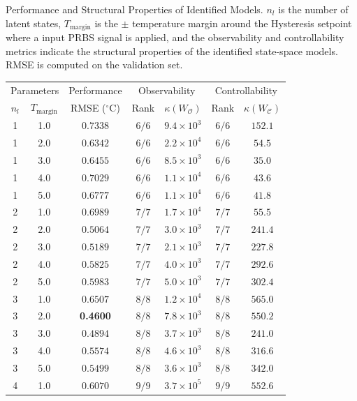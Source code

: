 
\caption{Performance and Structural Properties of Identified Models. $n_l$ is the number of latent states, $T_{\mathrm{margin}}$ is the $\pm$ temperature margin around the Hysteresis setpoint where a input PRBS signal is applied, and the observability and controllability metrics indicate the structural properties of the identified state-space models. RMSE is computed on the validation set.}
\label{tab:model_analysis}
\begin{tabular}{cc c cc cc}
\toprule
\multicolumn{2}{c}{Parameters} & \multicolumn{1}{c}{Performance} & \multicolumn{2}{c}{Observability} & \multicolumn{2}{c}{Controllability} \\
\cmidrule(lr){1-2} \cmidrule(lr){3-3} \cmidrule(lr){4-5} \cmidrule(lr){6-7}
$n_l$ & $T_{\mathrm{margin}}$ & RMSE ($^\circ$C) & Rank & $\kappa(W_{\mathcal{O}})$ & Rank & $\kappa(W_{\mathcal{C}})$ \\
\midrule
1 & 1.0 & $0.7338$ & $6/6$ & $9.4 \times 10^{3}$ & $6/6$ & $152.1$ \\
1 & 2.0 & $0.6342$ & $6/6$ & $2.2 \times 10^{4}$ & $6/6$ & $54.5$ \\
1 & 3.0 & $0.6455$ & $6/6$ & $8.5 \times 10^{3}$ & $6/6$ & $35.0$ \\
1 & 4.0 & $0.7029$ & $6/6$ & $1.1 \times 10^{4}$ & $6/6$ & $43.6$ \\
1 & 5.0 & $0.6777$ & $6/6$ & $1.1 \times 10^{4}$ & $6/6$ & $41.8$ \\
2 & 1.0 & $0.6989$ & $7/7$ & $1.7 \times 10^{4}$ & $7/7$ & $55.5$ \\
2 & 2.0 & $0.5064$ & $7/7$ & $3.0 \times 10^{3}$ & $7/7$ & $241.4$ \\
2 & 3.0 & $0.5189$ & $7/7$ & $2.1 \times 10^{3}$ & $7/7$ & $227.8$ \\
2 & 4.0 & $0.5825$ & $7/7$ & $4.0 \times 10^{3}$ & $7/7$ & $292.6$ \\
2 & 5.0 & $0.5983$ & $7/7$ & $5.0 \times 10^{3}$ & $7/7$ & $302.4$ \\
3 & 1.0 & $0.6507$ & $8/8$ & $1.2 \times 10^{4}$ & $8/8$ & $565.0$ \\
3 & 2.0 & \textbf{0.4600} & $8/8$ & $7.8 \times 10^{3}$ & $8/8$ & $550.2$ \\
3 & 3.0 & $0.4894$ & $8/8$ & $3.7 \times 10^{3}$ & $8/8$ & $241.0$ \\
3 & 4.0 & $0.5574$ & $8/8$ & $4.6 \times 10^{3}$ & $8/8$ & $316.6$ \\
3 & 5.0 & $0.5499$ & $8/8$ & $3.6 \times 10^{3}$ & $8/8$ & $342.0$ \\
4 & 1.0 & $0.6070$ & $9/9$ & $3.7 \times 10^{5}$ & $9/9$ & $552.6$ \\

\end{tabular}
